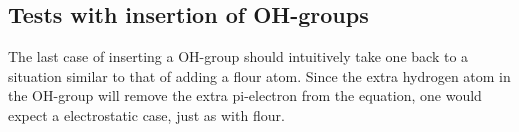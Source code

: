 \subsection{Tests with insertion of OH-groups}
The last case of inserting a OH-group should intuitively take one back to a situation similar to that of adding a flour atom. Since the extra hydrogen atom in the OH-group will remove the extra pi-electron from the equation, one would expect a electrostatic case, just as with flour. 
